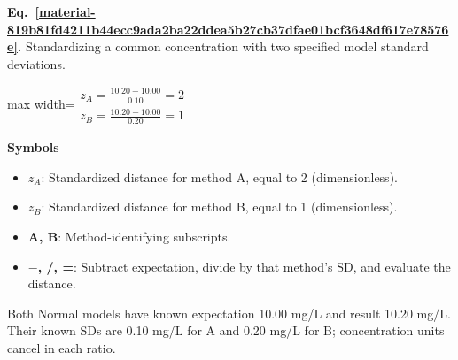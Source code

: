 \documentclass[11pt,a4paper]{article}
\begin{document}
\par\medskip
\begin{samepage}
\label{material-819b81fd4211b44ecc9ada2ba22ddea5b27cb37dfae01bcf3648df617e78576e}
\noindent\textbf{Eq.~\ref*{material-819b81fd4211b44ecc9ada2ba22ddea5b27cb37dfae01bcf3648df617e78576e}.} Standardizing a common concentration with two specified model standard deviations.\par\nopagebreak
\begin{center}\begin{adjustbox}{max width=\linewidth}$\displaystyle \begin{gathered}z_A=\frac{10.20-10.00}{0.10}=2\\z_B=\frac{10.20-10.00}{0.20}=1\end{gathered}$\end{adjustbox}\end{center}

\par\noindent\textbf{Symbols}

\begin{itemize}\setlength{\itemsep}{1pt}\setlength{\parsep}{0pt}
\item \textbf{\(z_A\)}: Standardized distance for method A, equal to 2 (dimensionless).
\item \textbf{\(z_B\)}: Standardized distance for method B, equal to 1 (dimensionless).
\item \textbf{A, B}: Method-identifying subscripts.
\item \textbf{\ensuremath{-}, /, =}: Subtract expectation, divide by that method's SD, and evaluate the distance.
\end{itemize}

Both Normal models have known expectation 10.00 mg/L and result 10.20 mg/L. Their known SDs are 0.10 mg/L for A and 0.20 mg/L for B; concentration units cancel in each ratio.

\end{samepage}
\medskip
\end{document}
